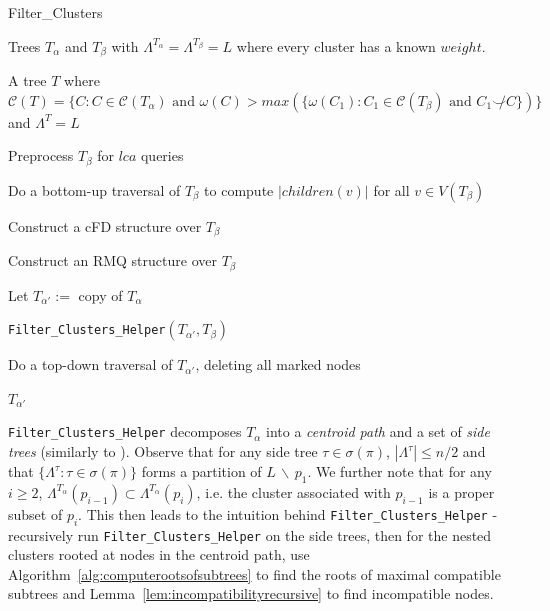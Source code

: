 \documentclass{article}
\newcommand{\compatible}{\smile}
\newcommand{\leafset}{\Lambda}
\newcommand{\weight}{\omega}
\newcommand{\TA}{T_\alpha}
\newcommand{\TB}{T_\beta}
\begin{document}
    \begin{algorithm}
        \caption{Filter\_Clusters}
        \begin{algorithmic}[1]
            \Input Trees $\TA$ and $\TB$ with $\leafset^{\TA} = \leafset^{\TB} = L$ where every cluster has a known $weight$.

            \Output A tree $T$ where $\mathcal{C}(T) = \{C : C \in \mathcal{C}(\TA) \text{ and } \weight(C) > max(\{\weight(C_1) : C_1 \in \mathcal{C}(\TB) \text{ and } C_1 \not\compatible C\})\}$ and $\leafset^T = L$

            \State Preprocess $\TB$ for $lca$ queries

            \State Do a bottom-up traversal of $\TB$ to compute $|children(v)|$ for all $v \in V(\TB)$

            \State Construct a cFD structure over $\TB$

            \State Construct an RMQ structure over $\TB$

            \State Let $T_{\alpha'} :=$ copy of $\TA$

            \State \texttt{Filter\_Clusters\_Helper}$(T_{\alpha'}, \TB)$

            \State Do a top-down traversal of $T_{\alpha'}$, deleting all marked nodes

            \State \Return $T_{\alpha'}$
        \end{algorithmic}
    \end{algorithm}

    \texttt{Filter\_Clusters\_Helper} decomposes $\TA$ into a \textit{centroid path} and a set of \textit{side trees} (similarly to \cite{jansson2018algorithms}). Observe that for any side tree $\tau \in \sigma(\pi)$, $|\leafset^\tau| \leq n/2$ and that $\{\leafset^\tau : \tau \in \sigma(\pi)\}$ forms a partition of $L\, \backslash\, {p_1}$. We further note that for any $i \geq 2$, $\leafset^{\TA}(p_{i - 1}) \subset \leafset^{\TA}(p_i)$, i.e. the cluster associated with $p_{i-1}$ is a proper subset of $p_i$. This then leads to the intuition behind \texttt{Filter\_Clusters\_Helper} - recursively run \texttt{Filter\_Clusters\_Helper} on the side trees, then for the nested clusters rooted at nodes in the centroid path, use Algorithm~\ref{alg:computerootsofsubtrees} to find the roots of maximal compatible subtrees and Lemma~\ref{lem:incompatibilityrecursive} to find incompatible nodes.
\end{document}
